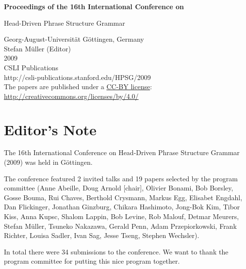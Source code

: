 \documentclass[11pt,a4paper,fleqn]{article}
\begin{document}
\begin{center}
{\Large
                {\bfseries Proceedings of the 16th International Conference on\par Head-Driven Phrase Structure Grammar\par}

                \vspace{8ex}

                     Georg-August-Universit\"{a}t G{\"o}ttingen, Germany\\[\baselineskip]

                        Stefan M{\"u}ller (Editor)\\[\baselineskip]

                                2009\\[\baselineskip]

                          CSLI Publications\\[\baselineskip]

              http://csli-publications.stanford.edu/HPSG/2009 \\[4\baselineskip]

The papers are published under a \href{http://creativecommons.org/licenses/by/4.0/}{CC-BY license}:\\[3pt]
\href{http://creativecommons.org/licenses/by/4.0/}{http://creativecommons.org/licenses/by/4.0/}
}
\end{center}
\newpage
\tableofcontents

\newpage

\section{Editor's Note}
The 16th International Conference on Head-Driven Phrase Structure Grammar (2009) was held in Göttingen.

The conference featured 2 invited talks and 19 papers selected by the program committee (Anne
Abeille, Doug Arnold [chair], Olivier Bonami, Bob Borsley, Gosse Bouma, Rui Chaves, Berthold
Crysmann, Markus Egg, Elisabet Engdahl, Dan Flickinger, Jonathan Ginzburg, Chikara Hashimoto,
Jong-Bok Kim, Tibor Kiss, Anna Kupsc, Shalom Lappin, Bob Levine, Rob Malouf, Detmar Meurers, Stefan
Müller, Tsuneko Nakazawa, Gerald Penn, Adam Przepiorkowski, Frank Richter, Louisa Sadler, Ivan Sag,
Jesse Tseng, Stephen Wechsler).


In total there were 34  submissions to the conference.
We want to thank the  program committee for putting this nice program together.
\end{document}
